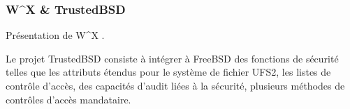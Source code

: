 \documentclass[pdftex,a4paper,titlepage,11pt]{article}
\begin{document}
\subsubsection{W\^{}X \& TrustedBSD}

Présentation de W\^{}X \cite{TRUSTEDBSD}.

Le projet TrustedBSD consiste à intégrer à FreeBSD des fonctions de sécurité telles que les attributs étendus pour le système de fichier UFS2, les listes de contrôle d'accès, des capacités d'audit liées à la sécurité, plusieurs méthodes de contrôles d'accès mandataire.

%

%
%
%
\end{document}
